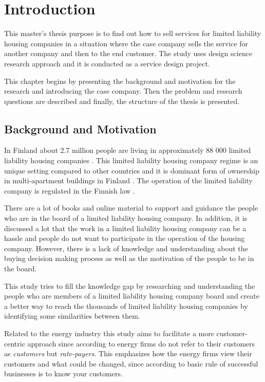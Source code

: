 \chapter{Introduction}
\label{chapter:intro}

This master's thesis purpose is to find out how to sell services for limited liability housing companies in a situation where the case company sells the service for another company and then to the end customer. The study uses design science research approach and it is conducted as a service design project.

This chapter begins by presenting the background and motivation for the research and introducing the case company. Then the problem and research questions are described and finally, the structure of the thesis is presented.

\section{Background and Motivation}

In Finland about 2.7 million people are living in approximately 88 000 limited liability housing companies \parencite{REMF, Stats}. This limited liability housing company regime is an unique setting compared to other countries and it is dominant form of ownership in multi-apartment buildings in Finland \parencite{Lujanen:2017}. The operation of the limited liability company is regulated in the Finnish law \parencite{YIT}.

There are a lot of books and online material to support and guidance the people who are in the board of a limited liability housing company. In addition, it is discussed a lot that the work in a limited liability housing company can be a hassle and people do not want to participate in the operation of the housing company. However, there is a lack of knowledge and understanding about the buying decision making process as well as the motivation of the people to be in the board.

This study tries to fill the knowledge gap by researching and understanding the people who are members of a limited liability housing company board and create a better way to reach the thousands of limited liability housing companies by identifying some similarities between them.

Related to the energy industry this study aims to facilitate a more customer-centric approach since according to \textcite{Fader:2012} energy firms do not refer to their customers as \emph{customers} but \emph{rate-payers}. This emphasizes how the energy firms view their customers and what could be changed, since according to \textcite{ByerPersonas:2015} basic rule of successful businesses is to know your customers.

